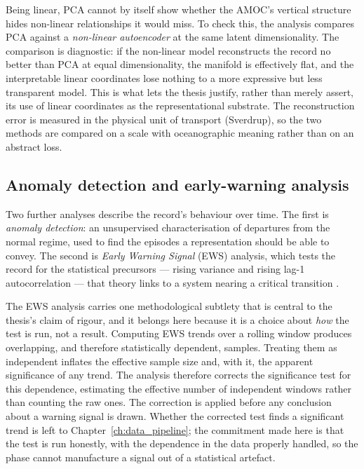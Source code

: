 Being linear, PCA cannot by itself show whether the AMOC's vertical structure hides non-linear relationships it would miss. To check this, the analysis compares PCA against a \emph{non-linear autoencoder} at the same latent dimensionality. The comparison is diagnostic: if the non-linear model reconstructs the record no better than PCA at equal dimensionality, the manifold is effectively flat, and the interpretable linear coordinates lose nothing to a more expressive but less transparent model. This is what lets the thesis justify, rather than merely assert, its use of linear coordinates as the representational substrate. The reconstruction error is measured in the physical unit of transport (Sverdrup), so the two methods are compared on a scale with oceanographic meaning rather than on an abstract loss.

\subsection{Anomaly detection and early-warning analysis}
\label{subsec:detect-ews}

Two further analyses describe the record's behaviour over time. The first is \emph{anomaly detection}: an unsupervised characterisation of departures from the normal regime, used to find the episodes a representation should be able to convey. The second is \emph{Early Warning Signal} (EWS) analysis, which tests the record for the statistical precursors --- rising variance and rising lag-1 autocorrelation --- that theory links to a system nearing a critical transition \citep{scheffer2009, dakos2012}.

The EWS analysis carries one methodological subtlety that is central to the thesis's claim of rigour, and it belongs here because it is a choice about \emph{how} the test is run, not a result. Computing EWS trends over a rolling window produces overlapping, and therefore statistically dependent, samples. Treating them as independent inflates the effective sample size and, with it, the apparent significance of any trend. The analysis therefore corrects the significance test for this dependence, estimating the effective number of independent windows rather than counting the raw ones. The correction is applied before any conclusion about a warning signal is drawn. Whether the corrected test finds a significant trend is left to Chapter~\ref{ch:data_pipeline}; the commitment made here is that the test is run honestly, with the dependence in the data properly handled, so the phase cannot manufacture a signal out of a statistical artefact.

